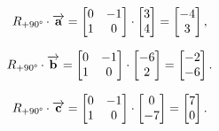 \vspace{-.15in}
\begin{align*}
R_{+90\degree} \cdot \overrightarrow{\textbf{a}} &=
\begin{bmatrix}
0 & -1 \\
1 & 0 \\
\end{bmatrix} \cdot
\begin{bmatrix}
3 \\ 4 \\
\end{bmatrix} =
\begin{bmatrix}
-4 \\ 3 \\
\end{bmatrix},
\end{align*}

\vspace{-.15in}
\begin{align*}
R_{+90\degree} \cdot \overrightarrow{\textbf{b}} &=
\begin{bmatrix}
0 & -1 \\
1 & 0 \\
\end{bmatrix} \cdot
\begin{bmatrix}
-6 \\ 2 \\
\end{bmatrix} =
\begin{bmatrix}
-2 \\ -6 \\
\end{bmatrix}.
\end{align*}

\vspace{-.15in}
\begin{align*}
R_{+90\degree} \cdot \overrightarrow{\textbf{c}} &=
\begin{bmatrix}
0 & -1 \\
1 & 0 \\
\end{bmatrix} \cdot
\begin{bmatrix}
0 \\ -7 \\
\end{bmatrix} =
\begin{bmatrix}
7 \\ 0 \\
\end{bmatrix}.
\end{align*}
\vspace{-.15in}


